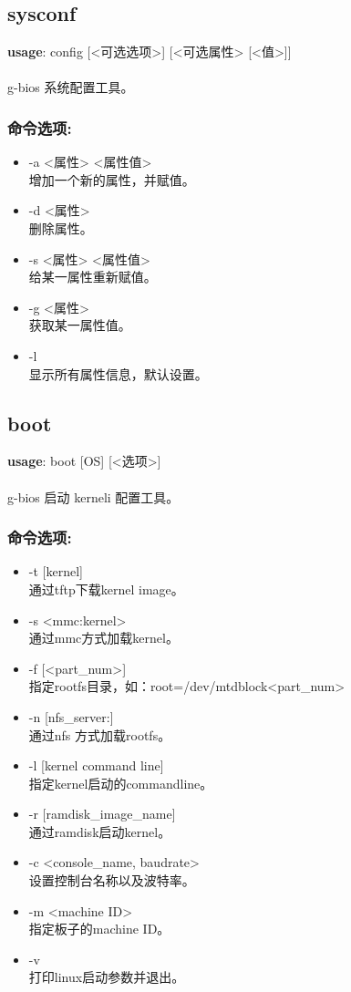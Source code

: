 \subsection{sysconf}
\textbf{usage}: config [<可选选项>] [<可选属性> [<值>]] \\
\\ g-bios 系统配置工具。

\subsubsection{命令选项:}
\begin{itemize}
	\item -a <属性> <属性值> \\
	增加一个新的属性，并赋值。
	\item -d <属性> \\
	删除属性。
	\item -s <属性> <属性值> \\
	给某一属性重新赋值。
	\item -g <属性> \\
	获取某一属性值。
	\item -l \\
	显示所有属性信息，默认设置。
\end{itemize}

\subsection{boot}
\textbf{usage}: boot [OS] [<选项>] \\
\\ g-bios 启动 kerneli 配置工具。

\subsubsection{命令选项:}
\begin{itemize}
	\item -t [kernel] \\
	通过tftp下载kernel image。
	\item -s <mmc:kernel> \\
	通过mmc方式加载kernel。
	\item -f [<part\_num>] \\
	指定rootfs目录，如：root=/dev/mtdblock<part\_num>
	\item -n [nfs\_server:] \\
	通过nfs 方式加载rootfs。
	\item -l [kernel command line] \\
	指定kernel启动的commandline。
	\item -r [ramdisk\_image\_name] \\
	通过ramdisk启动kernel。
	\item -c <console\_name, baudrate> \\
	设置控制台名称以及波特率。%
	\item -m <machine ID> \\
	指定板子的machine ID。
	\item -v \\
	打印linux启动参数并退出。
\end{itemize}

